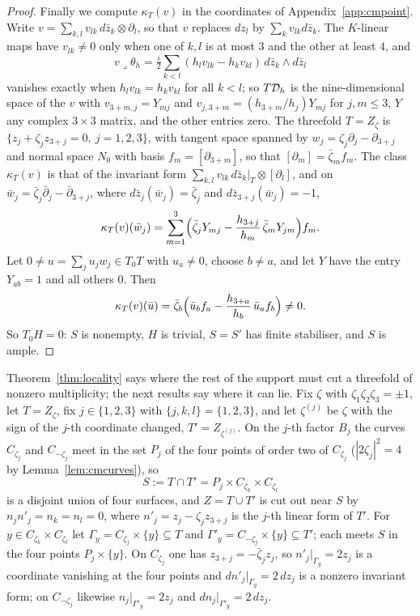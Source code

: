 \begin{proof}
Finally we compute $\kappa_{T}(v)$ in the coordinates of Appendix~\ref{app:cmpoint}. Write $v=\sum_{k,l}v_{lk}\,d\bar z_{k}\otimes\partial_{l}$, so that $v$ replaces $dz_{l}$ by $\sum_{k}v_{lk}d\bar z_{k}$. The $K$-linear maps have $v_{lk}\ne0$ only when one of $k,l$ is at most $3$ and the other at least $4$, and
\[
v\lrcorner\theta_{h}=\tfrac{i}{2}\sum_{k<l}(h_{l}v_{lk}-h_{k}v_{kl})\,d\bar z_{k}\wedge d\bar z_{l}
\]
vanishes exactly when $h_{l}v_{lk}=h_{k}v_{kl}$ for all $k<l$; so $T\mathcal{D}_{h}$ is the nine-dimensional space of the $v$ with $v_{3+m,j}=Y_{mj}$ and $v_{j,3+m}=(h_{3+m}/h_{j})Y_{mj}$ for $j,m\le3$, $Y$ any complex $3\times3$ matrix, and the other entries zero. The threefold $T=Z_{\zeta}$ is $\{z_{j}+\zeta_{j}z_{3+j}=0,\ j=1,2,3\}$, with tangent space spanned by $w_{j}=\zeta_{j}\partial_{j}-\partial_{3+j}$ and normal space $N_{0}$ with basis $f_{m}=[\partial_{3+m}]$, so that $[\partial_{m}]=\bar\zeta_{m}f_{m}$. The class $\kappa_{T}(v)$ is that of the invariant form $\sum_{k,l}v_{lk}\,d\bar z_{k}|_{T}\otimes[\partial_{l}]$, and on $\bar w_{j}=\bar\zeta_{j}\bar\partial_{j}-\bar\partial_{3+j}$, where $d\bar z_{j}(\bar w_{j})=\bar\zeta_{j}$ and $d\bar z_{3+j}(\bar w_{j})=-1$,
\[
\kappa_{T}(v)(\bar w_{j})=\sum_{m=1}^{3}\Bigl(\bar\zeta_{j}Y_{mj}-\frac{h_{3+j}}{h_{m}}\,\bar\zeta_{m}Y_{jm}\Bigr)f_{m}.
\]
Let $0\ne u=\sum_{j}u_{j}w_{j}\in T_{0}T$ with $u_{a}\ne0$, choose $b\ne a$, and let $Y$ have the entry $Y_{ab}=1$ and all others $0$. Then
\[
\kappa_{T}(v)(\bar u)=\bar\zeta_{b}\Bigl(\bar u_{b}f_{a}-\frac{h_{3+a}}{h_{b}}\,\bar u_{a}f_{b}\Bigr)\ne0 .
\]
So $T_{0}H=0$: $S$ is nonempty, $H$ is trivial, $S=S'$ has finite stabiliser, and $S$ is ample.
\end{proof}

Theorem~\ref{thm:locality} says where the rest of the support must cut a threefold of nonzero multiplicity; the next results say where it can lie. Fix $\zeta$ with $\zeta_{1}\zeta_{2}\zeta_{3}=\pm1$, let $T=Z_{\zeta}$, fix $j\in\{1,2,3\}$ with $\{j,k,l\}=\{1,2,3\}$, and let $\zeta^{(j)}$ be $\zeta$ with the sign of the $j$-th coordinate changed, $T'=Z_{\zeta^{(j)}}$. On the $j$-th factor $B_{j}$ the curves $C_{\zeta_{j}}$ and $C_{-\zeta_{j}}$ meet in the set $P_{j}$ of the four points of order two of $C_{\zeta_{j}}$ ($|2\zeta_{j}|^{2}=4$ by Lemma~\ref{lem:cmcurves}), so
\[
S:=T\cap T'=P_{j}\times C_{\zeta_{k}}\times C_{\zeta_{l}}
\]
is a disjoint union of four surfaces, and $Z=T\cup T'$ is cut out near $S$ by $n_{j}n'_{j}=n_{k}=n_{l}=0$, where $n'_{j}=z_{j}-\zeta_{j}z_{3+j}$ is the $j$-th linear form of $T'$. For $y\in C_{\zeta_{k}}\times C_{\zeta_{l}}$ let $\Gamma_{y}=C_{\zeta_{j}}\times\{y\}\subseteq T$ and $\Gamma'_{y}=C_{-\zeta_{j}}\times\{y\}\subseteq T'$; each meets $S$ in the four points $P_{j}\times\{y\}$. On $C_{\zeta_{j}}$ one has $z_{3+j}=-\bar\zeta_{j}z_{j}$, so $n'_{j}|_{\Gamma_{y}}=2z_{j}$ is a coordinate vanishing at the four points and $dn'_{j}|_{\Gamma_{y}}=2\,dz_{j}$ is a nonzero invariant form; on $C_{-\zeta_{j}}$ likewise $n_{j}|_{\Gamma'_{y}}=2z_{j}$ and $dn_{j}|_{\Gamma'_{y}}=2\,dz_{j}$.

